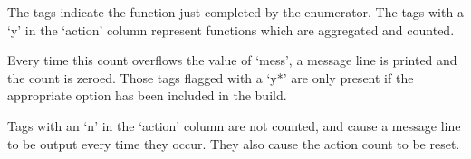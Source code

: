 

The tags indicate the function  just completed by the enumerator.  The
tags with a  `y' in the `action' column  represent functions which are
aggregated and counted.

Every time this count overflows the value of `mess', a message line is
printed and the  count is zeroed.  Those tags flagged  with a `y*' are
only present if the appropriate option has been included in the build.

Tags with an `n' in the `action' column are not counted, and cause a
message line to be output every time they occur.
They also cause the action count to be reset.

